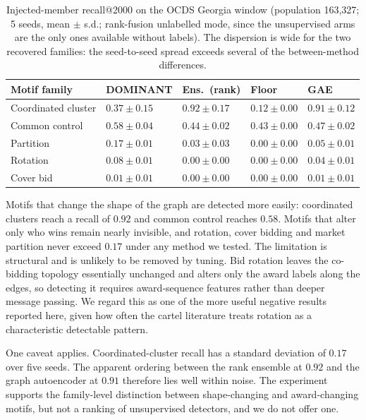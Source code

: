 \documentclass[conference]{IEEEtran}
\begin{document}
\begin{table}[t]
\caption{Injected-member recall@2000 on the OCDS Georgia window (population
163,327; 5 seeds, mean $\pm$ s.d.; rank-fusion unlabelled mode, since the
unsupervised arms are the only ones available without labels). The dispersion
is wide for the two recovered families: the seed-to-seed spread exceeds several
of the between-method differences.}
\label{tab:t6}
\centering
\footnotesize
\setlength{\tabcolsep}{1.5pt}
\begin{tabular}{lllll}
\toprule
Motif family & DOMINANT & Ens.\ (rank) & Floor & GAE \\
\midrule
Coordinated cluster & $0.37 \pm 0.15$ & $\mathbf{0.92 \pm 0.17}$ & $0.12 \pm 0.00$ & $0.91 \pm 0.12$ \\
Common control & $\mathbf{0.58 \pm 0.04}$ & $0.44 \pm 0.02$ & $0.43 \pm 0.00$ & $0.47 \pm 0.02$ \\
Partition & $0.17 \pm 0.01$ & $0.03 \pm 0.03$ & $0.00 \pm 0.00$ & $0.05 \pm 0.01$ \\
Rotation & $0.08 \pm 0.01$ & $0.00 \pm 0.00$ & $0.00 \pm 0.00$ & $0.04 \pm 0.01$ \\
Cover bid & $0.01 \pm 0.01$ & $0.00 \pm 0.00$ & $0.00 \pm 0.00$ & $0.01 \pm 0.01$ \\
\bottomrule
\end{tabular}
\end{table}

Motifs that change the shape of the graph are detected more easily: coordinated
clusters reach a recall of $0.92$ and common control reaches $0.58$. Motifs that
alter only who wins remain nearly invisible, and rotation, cover bidding and
market partition never exceed $0.17$ under any method we tested. The limitation
is structural and is unlikely to be removed by tuning. Bid rotation leaves the
co-bidding topology essentially unchanged and alters only the award labels
along the edges, so detecting it requires award-sequence features rather than
deeper message passing. We regard this as one of the more useful negative
results reported here, given how often the cartel literature treats rotation as
a characteristic detectable pattern.

One caveat applies. Coordinated-cluster recall has a standard deviation of
$0.17$ over five seeds. The apparent ordering between the rank ensemble at
$0.92$ and the graph autoencoder at $0.91$ therefore lies well within noise. The
experiment supports the family-level distinction between shape-changing and
award-changing motifs, but not a ranking of unsupervised detectors, and we do
not offer one.
\end{document}
